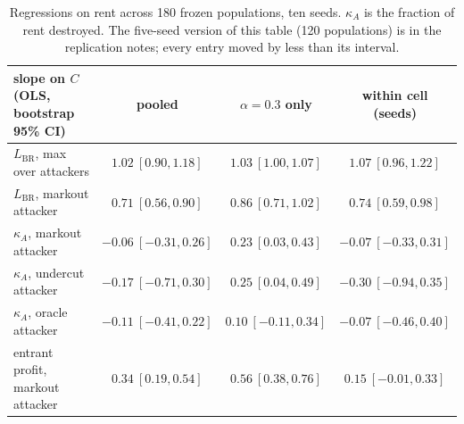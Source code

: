 \documentclass[11pt]{article}
\begin{document}
\begin{table}[h]\small\centering
\begin{tabular}{lccc}
\toprule
slope on $C$ (OLS, bootstrap 95\% CI) & pooled & $\alpha=0.3$ only & within cell (seeds) \\
\midrule
$L_{\mathrm{BR}}$, max over attackers & $1.02\ [0.90,1.18]$ & $1.03\ [1.00,1.07]$ & $1.07\ [0.96,1.22]$ \\
$L_{\mathrm{BR}}$, markout attacker & $0.71\ [0.56,0.90]$ & $0.86\ [0.71,1.02]$ & $0.74\ [0.59,0.98]$ \\
$\kappa_A$, markout attacker & $-0.06\ [-0.31,0.26]$ & $0.23\ [0.03,0.43]$ & $-0.07\ [-0.33,0.31]$ \\
$\kappa_A$, undercut attacker & $-0.17\ [-0.71,0.30]$ & $0.25\ [0.04,0.49]$ & $-0.30\ [-0.94,0.35]$ \\
$\kappa_A$, oracle attacker & $-0.11\ [-0.41,0.22]$ & $0.10\ [-0.11,0.34]$ & $-0.07\ [-0.46,0.40]$ \\
entrant profit, markout attacker & $0.34\ [0.19,0.54]$ & $0.56\ [0.38,0.76]$ & $0.15\ [-0.01,0.33]$ \\
\bottomrule
\end{tabular}
\caption{Regressions on rent across 180 frozen populations, ten seeds. $\kappa_A$ is the fraction of rent destroyed. The five-seed version of this table (120 populations) is in the replication notes; every entry moved by less than its interval.}\label{tab:exploit}
\end{table}
\end{document}
